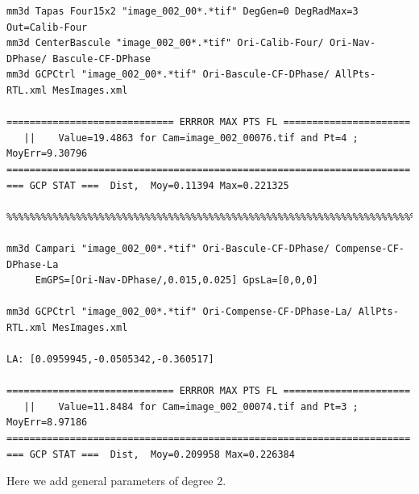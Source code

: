 \begin{verbatim}
mm3d Tapas Four15x2 "image_002_00*.*tif" DegGen=0 DegRadMax=3 Out=Calib-Four
mm3d CenterBascule "image_002_00*.*tif" Ori-Calib-Four/ Ori-Nav-DPhase/ Bascule-CF-DPhase
mm3d GCPCtrl "image_002_00*.*tif" Ori-Bascule-CF-DPhase/ AllPts-RTL.xml MesImages.xml

============================= ERRROR MAX PTS FL ======================
   ||    Value=19.4863 for Cam=image_002_00076.tif and Pt=4 ; MoyErr=9.30796
======================================================================
=== GCP STAT ===  Dist,  Moy=0.11394 Max=0.221325

%%%%%%%%%%%%%%%%%%%%%%%%%%%%%%%%%%%%%%%%%%%%%%%%%%%%%%%%%%%%%%%%%%%%%%%%%%%%%%%%%%%%%%%%%       
       
mm3d Campari "image_002_00*.*tif" Ori-Bascule-CF-DPhase/ Compense-CF-DPhase-La 
     EmGPS=[Ori-Nav-DPhase/,0.015,0.025] GpsLa=[0,0,0]
     
mm3d GCPCtrl "image_002_00*.*tif" Ori-Compense-CF-DPhase-La/ AllPts-RTL.xml MesImages.xml

LA: [0.0959945,-0.0505342,-0.360517]

============================= ERRROR MAX PTS FL ======================
   ||    Value=11.8484 for Cam=image_002_00074.tif and Pt=3 ; MoyErr=8.97186
======================================================================
=== GCP STAT ===  Dist,  Moy=0.209958 Max=0.226384
\end{verbatim}


Here we add general parameters of degree 2.

